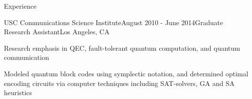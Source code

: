 \documentclass{resume} %
\begin{document}
\begin{rSection}{Experience}
\begin{rSubsection}{USC Communications Science Institute}{August 2010 - June 2014}{Graduate Research Assistant}{Los Angeles, CA}
\item Research emphasis in QEC, fault-tolerant quantum computation, and quantum communication
\item Modeled quantum block codes using symplectic notation, and determined optimal encoding circuits via computer techniques including SAT-solvers, GA and SA heuristics
\end{rSubsection}





\end{rSection}
\end{document}
